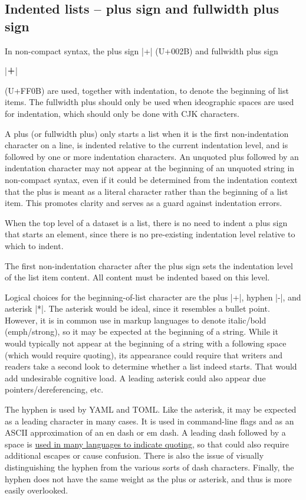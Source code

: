 \documentclass[11pt]{article}
\begin{document}
\subsection{Indented lists -- plus sign and fullwidth plus sign}

In non-compact syntax, the plus sign |+| (U+002B) and fullwidth plus sign \begin{CJK*}{UTF8}{gkai}|＋|\end{CJK*} (U+FF0B) are used, together with indentation, to denote the beginning of list items.  The fullwidth plus should only be used when ideographic spaces are used for indentation, which should only be done with CJK characters.

A plus (or fullwidth plus) only starts a list when it is the first non-indentation character on a line, is indented relative to the current indentation level, and is followed by one or more indentation characters.  An unquoted plus followed by an indentation character may not appear at the beginning of an unquoted string in non-compact syntax, even if it could be determined from the indentation context that the plus is meant as a literal character rather than the beginning of a list item.  This promotes clarity and serves as a guard against indentation errors.

When the top level of a dataset is a list, there is no need to indent a plus sign that starts an element, since there is no pre-existing indentation level relative to which to indent.

The first non-indentation character after the plus sign sets the indentation level of the list item content.  All content must be indented based on this level.

Logical choices for the beginning-of-list character are the plus |+|, hyphen |-|, and asterisk |*|.  The asterisk would be ideal, since it resembles a bullet point.  However, it is in common use in markup languages to denote italic/bold (emph/strong), so it may be expected at the beginning of a string.  While it would typically not appear at the beginning of a string with a following space (which would require quoting), its appearance could require that writers and readers take a second look to determine whether a list indeed starts.  That would add undesirable cognitive load.  A leading asterisk could also appear due pointers/dereferencing, etc.

The hyphen is used by YAML and TOML.  Like the asterisk, it may be expected as a leading character in many cases.  It is used in command-line flags and as an ASCII approximation of an en dash or em dash.  A leading dash followed by a space is \href{https://en.wikipedia.org/wiki/Quotation_mark}{used in many languages to indicate quoting}, so that could also require additional escapes or cause confusion.  There is also the issue of visually distinguishing the hyphen from the various sorts of dash characters.  Finally, the hyphen does not have the same weight as the plus or asterisk, and thus is more easily overlooked.
\end{document}
